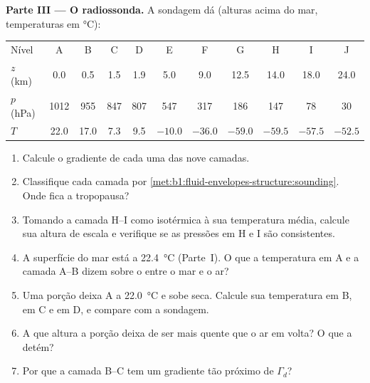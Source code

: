 \begin{problem}
\medskip
\noindent\textbf{Parte III --- O radiossonda.} A sondagem dá (alturas acima do mar,
temperaturas em \si{\celsius}):
\begin{center}
\small
\setlength{\tabcolsep}{4pt}
\begin{tabular}{|l|cccccccccc|}
\hline
Nível & A & B & C & D & E & F & G & H & I & J \\
$z$ (km) & 0.0 & 0.5 & 1.5 & 1.9 & 5.0 & 9.0 & 12.5 & 14.0 & 18.0 & 24.0 \\
$p$ (hPa) & 1012 & 955 & 847 & 807 & 547 & 317 & 186 & 147 & 78 & 30 \\
$T$ & 22.0 & 17.0 & 7.3 & 9.5 & $-10.0$ & $-36.0$ & $-59.0$ & $-59.5$ & $-57.5$ & $-52.5$ \\
\hline
\end{tabular}
\end{center}
\begin{enumerate}[resume]
  \item Calcule o gradiente de cada uma das nove camadas.
  \item Classifique cada camada por \cref{met:b1:fluid-envelopes-structure:sounding}. Onde fica a
        tropopausa?
  \item Tomando a camada H--I como isotérmica à sua temperatura média, calcule sua altura de escala
        e verifique se as pressões em H e I são consistentes.
  \item A superfície do mar está a \qty{22.4}{\celsius} (Parte~I). O que a temperatura em A e a
        camada A--B dizem sobre o  entre o mar e o ar?
  \item Uma porção deixa A a \qty{22.0}{\celsius} e sobe seca. Calcule sua temperatura em B, em C e
        em D, e compare com a sondagem.
  \item A que altura a porção deixa de ser mais quente que o ar em volta? O que a detém?
  \item Por que a camada B--C tem um gradiente tão próximo de $\Gamma_d$?
\end{enumerate}


\end{problem}
